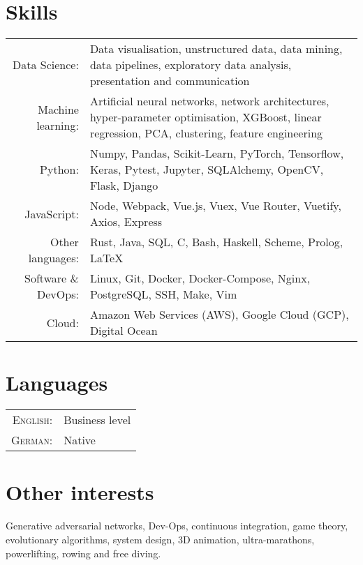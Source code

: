 \documentclass[11pt]{article}
\begin{document}
\section{Skills}

\begin{tabular}{ r p{} }
        Data Science: & Data visualisation, unstructured data, data mining, data pipelines, exploratory data analysis, presentation and communication \\
        Machine learning: & Artificial neural networks, network architectures, hyper-parameter optimisation, XGBoost, linear regression, PCA, clustering, feature engineering \\
        Python: & Numpy, Pandas, Scikit-Learn, PyTorch, Tensorflow, Keras, Pytest, Jupyter, SQLAlchemy, OpenCV, Flask, Django \\
        JavaScript: & Node, Webpack, Vue.js, Vuex, Vue Router, Vuetify, Axios, Express \\
        Other languages: & Rust, Java, SQL, C, Bash, Haskell, Scheme, Prolog, \LaTeX \\
        Software \& DevOps: & Linux, Git, Docker, Docker-Compose, Nginx, PostgreSQL, SSH, Make, Vim \\
        Cloud: & Amazon Web Services (AWS), Google Cloud (GCP), Digital Ocean \\
\end{tabular}

\section{Languages}
\begin{tabular}{rl}
        \textsc{English:} & Business level \\
        \textsc{German:} & Native \\
\end{tabular}

\section{Other interests}
    Generative adversarial networks, Dev-Ops, continuous integration, game theory, evolutionary algorithms, system design, 3D animation, ultra-marathons, powerlifting, rowing and free diving.
\end{document}
